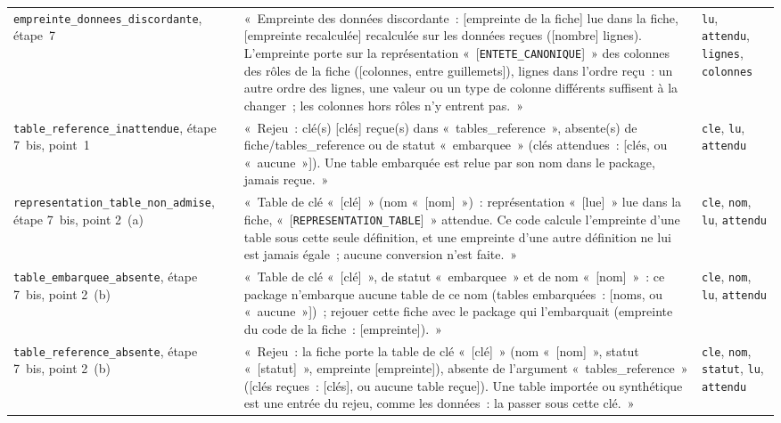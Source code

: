 \documentclass[a4paper,11pt]{article}
\newcommand{\code}[1]{\texttt{\small #1}}
\begin{document}
{\begin{longtable}{@{}p{5.5cm}p{6.7cm}p{2.4cm}@{}}
\code{empreinte\_donnees\_discordante}, étape~7 & «~Empreinte des données discordante~: [empreinte de la fiche] lue dans la fiche, [empreinte recalculée] recalculée sur les données reçues ([nombre] lignes). L'empreinte porte sur la représentation «~[\code{ENTETE\_CANONIQUE}]~» des colonnes des rôles de la fiche ([colonnes, entre guillemets]), lignes dans l'ordre reçu~: un autre ordre des lignes, une valeur ou un type de colonne différents suffisent à la changer~; les colonnes hors rôles n'y entrent pas.~» & \code{lu}, \code{attendu}, \code{lignes}, \code{colonnes} \\
\code{table\_reference\_inattendue}, étape 7~bis, point~1 & «~Rejeu~: clé(s) [clés] reçue(s) dans «~tables\_reference~», absente(s) de fiche/tables\_reference ou de statut «~embarquee~» (clés attendues~: [clés, ou «~aucune~»]). Une table embarquée est relue par son nom dans le package, jamais reçue.~» & \code{cle}, \code{lu}, \code{attendu} \\
\code{representation\_table\_}\allowbreak\code{non\_admise}, étape 7~bis, point 2~(a) & «~Table de clé «~[clé]~» (nom «~[nom]~»)~: représentation «~[lue]~» lue dans la fiche, «~[\code{REPRESENTATION\_TABLE}]~» attendue. Ce code calcule l'empreinte d'une table sous cette seule définition, et une empreinte d'une autre définition ne lui est jamais égale~; aucune conversion n'est faite.~» & \code{cle}, \code{nom}, \code{lu}, \code{attendu} \\
\code{table\_embarquee\_absente}, étape 7~bis, point 2~(b) & «~Table de clé «~[clé]~», de statut «~embarquee~» et de nom «~[nom]~»~: ce package n'embarque aucune table de ce nom (tables embarquées~: [noms, ou «~aucune~»])~; rejouer cette fiche avec le package qui l'embarquait (empreinte du code de la fiche~: [empreinte]).~» & \code{cle}, \code{nom}, \code{lu}, \code{attendu} \\
\code{table\_reference\_absente}, étape 7~bis, point 2~(b) & «~Rejeu~: la fiche porte la table de clé «~[clé]~» (nom «~[nom]~», statut «~[statut]~», empreinte [empreinte]), absente de l'argument «~tables\_reference~» ([clés reçues~: [clés], ou aucune table reçue]). Une table importée ou synthétique est une entrée du rejeu, comme les données~: la passer sous cette clé.~» & \code{cle}, \code{nom}, \code{statut}, \code{lu}, \code{attendu} \\

\end{longtable}}
\end{document}
